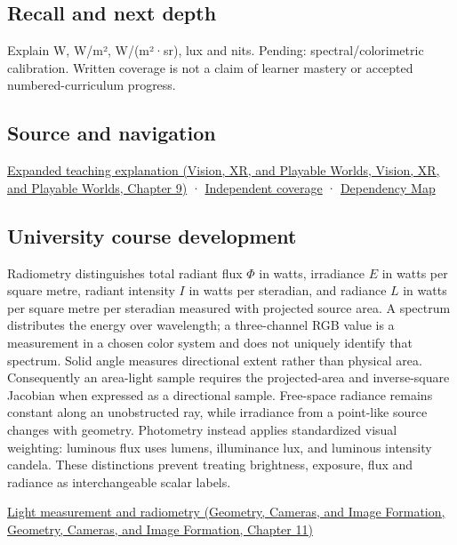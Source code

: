 \subsection{Recall and next depth}\label{appendix-215c2570199b-recall-and-next-depth}

Explain W, W/m², W/(m²·sr), lux and nits. Pending: spectral/colorimetric calibration. Written coverage is not a claim of learner mastery or accepted numbered-curriculum progress.

\subsection{Source and navigation}\label{appendix-215c2570199b-source-and-navigation}

\href{../07-Vision-XR-and-Playable-Worlds/main.pdf\#nameddest=04-visual-computing-ii-ch042-light-must-become-a-quantity-before-it-becomes-a-color}{Expanded teaching explanation (Vision, XR, and Playable Worlds, Vision, XR, and Playable Worlds, Chapter 9)} · \hyperref[appendix-fd090d982a15-xr01---independent-seeing-and-representation-source]{Independent coverage} · \hyperref[appendix-4ad47bdd269a]{Dependency Map}

\subsection{University course development}\label{appendix-215c2570199b-university-course-development}

Radiometry distinguishes total radiant flux \(\Phi\) in watts, irradiance \(E\) in watts per square metre, radiant intensity \(I\) in watts per steradian, and radiance \(L\) in watts per square metre per steradian measured with projected source area. A spectrum distributes the energy over wavelength; a three-channel RGB value is a measurement in a chosen color system and does not uniquely identify that spectrum. Solid angle measures directional extent rather than physical area. Consequently an area-light sample requires the projected-area and inverse-square Jacobian when expressed as a directional sample. Free-space radiance remains constant along an unobstructed ray, while irradiance from a point-like source changes with geometry. Photometry instead applies standardized visual weighting: luminous flux uses lumens, illuminance lux, and luminous intensity candela. These distinctions prevent treating brightness, exposure, flux and radiance as interchangeable scalar labels.

\href{../03-Geometry-Cameras-and-Image-Formation/main.pdf\#nameddest=03-visual-computing-i-ch004-light-measurement-and-radiometry}{Light measurement and radiometry (Geometry, Cameras, and Image Formation, Geometry, Cameras, and Image Formation, Chapter 11)}
